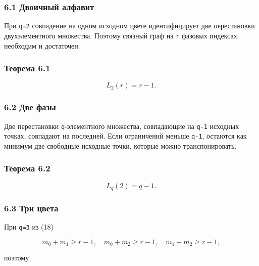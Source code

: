 \hypertarget{ux434ux432ux43eux438ux447ux43dux44bux439-ux430ux43bux444ux430ux432ux438ux442}{%
\subsubsection{6.1 Двоичный
алфавит}\label{ux434ux432ux43eux438ux447ux43dux44bux439-ux430ux43bux444ux430ux432ux438ux442}}

При \texttt{q=2} совпадение на одном исходном цвете идентифицирует две
перестановки двухэлементного множества. Поэтому связный граф на
\texttt{r} фазовых индексах необходим и достаточен.

\hypertarget{ux442ux435ux43eux440ux435ux43cux430-6.1}{%
\subsubsection{Теорема
6.1}\label{ux442ux435ux43eux440ux435ux43cux430-6.1}}

\[
\boxed{L_2(r)=r-1.}
\tag{20}
\]

\hypertarget{ux434ux432ux435-ux444ux430ux437ux44b}{%
\subsubsection{6.2 Две
фазы}\label{ux434ux432ux435-ux444ux430ux437ux44b}}

Две перестановки \texttt{q}-элементного множества, совпадающие на
\texttt{q-1} исходных точках, совпадают на последней. Если ограничений
меньше \texttt{q-1}, остаются как минимум две свободные исходные точки,
которые можно транспонировать.

\hypertarget{ux442ux435ux43eux440ux435ux43cux430-6.2}{%
\subsubsection{Теорема
6.2}\label{ux442ux435ux43eux440ux435ux43cux430-6.2}}

\[
\boxed{L_q(2)=q-1.}
\tag{21}
\]

\hypertarget{ux442ux440ux438-ux446ux432ux435ux442ux430}{%
\subsubsection{6.3 Три
цвета}\label{ux442ux440ux438-ux446ux432ux435ux442ux430}}

При \texttt{q=3} из (18)

\[
m_0+m_1\ge r-1,
\quad
m_0+m_2\ge r-1,
\quad
m_1+m_2\ge r-1,
\]

поэтому


